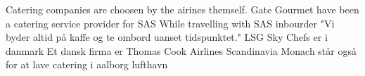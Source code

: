 Catering companies are choosen by the airines themself.
Gate Gourmet have been a catering service provider for SAS
While travelling with SAS inbourder "Vi byder altid på kaffe og te ombord uanset tidspunktet."
LSG Sky Chefs er i danmark
Et dansk firma er Thomas Cook Airlines Scandinavia
Monach står også for at lave catering i aalborg lufthavn